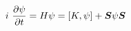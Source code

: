 \begin{equation}
i~\frac{\partial \psi}{\partial t} = H \psi = [K,\psi]+\mbox{\boldmath$S$} \psi \mbox{\boldmath$S$}  \label{eq:sekiz}
\end{equation}

